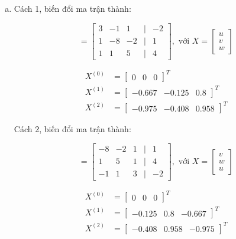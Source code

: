 \documentclass[12pt]{article}
\begin{document}
\begin{enumerate}[a)]

\item Cách 1, biến đổi ma trận thành:

\begin{equation}
 [A|B]=\begin{bmatrix}  3 & -1 & 1 & | & -2\\ 1 & -8 & -2 & | & 1\\ 1 & 1 & 5 & | & 4 \end{bmatrix}, \textrm{~với~} X=\begin{bmatrix}  u\\v\\w \end{bmatrix}
\end{equation}

\begin{align*}
X^{(0)} &= \begin{bmatrix} 
0 & 0 & 0 
\end{bmatrix}^T\\
X^{(1)} &= \begin{bmatrix}
-0.667 & -0.125 & 0.8
\end{bmatrix}^T\\
X^{(2)} &= \begin{bmatrix}
-0.975 & -0.408 & 0.958
\end{bmatrix}^T
\end{align*}

Cách 2, biến đổi ma trận thành:

\begin{equation}
 [A|B]=\begin{bmatrix}  -8 & -2 & 1 & | & 1\\ 1 & 5 & 1 & | & 4 \\ -1 & 1 & 3 & | & -2 \end{bmatrix}, \textrm{~với~} X=\begin{bmatrix}  v\\w\\u \end{bmatrix}
\end{equation}

\begin{align*}
X^{(0)} &= \begin{bmatrix} 
0 & 0 & 0 
\end{bmatrix}^T\\
X^{(1)} &= \begin{bmatrix}
-0.125 & 0.8 & -0.667
\end{bmatrix}^T\\
X^{(2)} &= \begin{bmatrix}
-0.408 & 0.958 & -0.975
\end{bmatrix}^T
\end{align*}


\end{enumerate}
\end{document}
